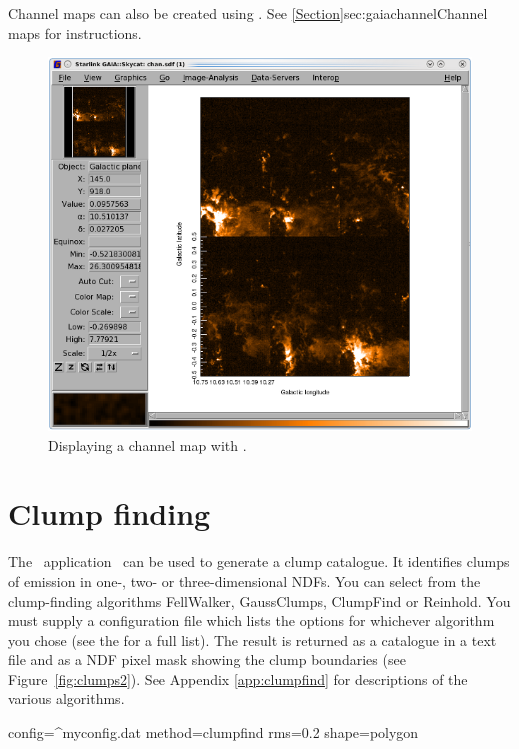 \documentclass[11pt,oneside,chapters]{starlink}
\begin{document}
Channel maps can also be created using \gaia. See
\cref{Section}{sec:gaiachannel}{Channel maps} for instructions.


\begin{figure}[h!]
\begin{center}
\includegraphics[width=0.8\linewidth]{sc20_chanmap}
\caption[Displaying a channel map with \gaia.]{\label{fig:chanmap}
  Displaying a channel map with \gaia.}
\end{center}
\end{figure}

\section{Clump finding}
\label{sec:clumpfind}

The \cupid\ application \findclumps\ can be used to generate a clump
catalogue. It identifies clumps of emission in one-, two- or
three-dimensional NDFs. You can select from the clump-finding
algorithms FellWalker, GaussClumps, ClumpFind or Reinhold. You must
supply a configuration file which lists the options for whichever
algorithm you chose (see the 
for a full list). The result is returned as a catalogue in a text file
and as a NDF pixel mask showing the clump boundaries (see
Figure~\ref{fig:clumps2}). See Appendix \ref{app:clumpfind} for descriptions
of the various algorithms.

\begin{terminalv}
  config=^myconfig.dat method=clumpfind rms=0.2 shape=polygon
\end{terminalv}
\end{document}
